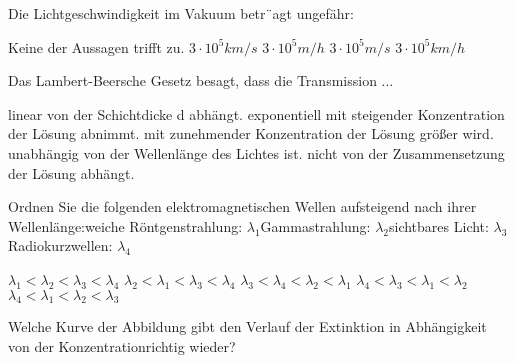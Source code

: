 \documentclass[11pt]{exam}
\begin{document}
\setlength{\voffset}{-0.5in}
\setlength{\headsep}{5pt}

\hspace{2mm}
 \hspace{5mm}
\vspace{4mm}

\begin{questions}

\question Die Lichtgeschwindigkeit im Vakuum betr¨agt ungefähr:

\begin{choices}
	\choice Keine der Aussagen trifft zu.
	\choice \( 3 \cdot10^5 km/s \)
	\choice \( 3 \cdot10^5 m/h \)
	\choice \( 3 \cdot10^5 m/s \)
	\choice \( 3 \cdot10^5 km/h \)
\end{choices}

\vspace{3mm}\question Das Lambert-Beersche Gesetz besagt, dass die Transmission ...

\begin{choices}
	\choice linear von der Schichtdicke d abhängt.
	\choice exponentiell mit steigender Konzentration der Lösung abnimmt.
	\choice mit zunehmender Konzentration der Lösung größer wird.
	\choice unabhängig von der Wellenlänge des Lichtes ist.
	\choice nicht von der Zusammensetzung der Lösung abhängt.
\end{choices}

\vspace{3mm}\question Ordnen Sie die folgenden elektromagnetischen Wellen aufsteigend nach ihrer Wellenlänge:weiche Röntgenstrahlung: \( \lambda_1 \)Gammastrahlung: \( \lambda_2 \)sichtbares Licht: \( \lambda_3 \)Radiokurzwellen: \( \lambda_4 \)

\begin{choices}
	\choice \( \lambda_1 < \lambda_2 < \lambda_3 < \lambda_4 \)
	\choice \( \lambda_2 < \lambda_1 < \lambda_3 < \lambda_4 \)
	\choice \( \lambda_3 < \lambda_4 < \lambda_2 < \lambda_1 \)
	\choice \( \lambda_4 < \lambda_3 < \lambda_1 < \lambda_2 \)
	\choice \( \lambda_4 < \lambda_1 < \lambda_2 < \lambda_3 \)
\end{choices}

\vspace{3mm}\question Welche Kurve der Abbildung gibt den Verlauf der Extinktion in Abhängigkeit von der Konzentrationrichtig wieder?


\end{questions}
\end{document}
